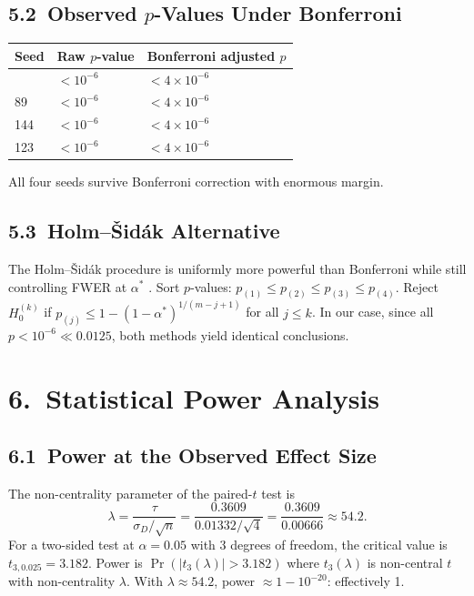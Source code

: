 \subsection{5.2\ Observed \(p\)-Values Under Bonferroni}

\begin{longtable}[]{@{}lll@{}}
\toprule\noalign{}
Seed & Raw \(p\)-value & Bonferroni adjusted \(p\) \\
\midrule\noalign{}
\endhead
\bottomrule\noalign{}
\endlastfoot
47  & \(< 10^{-6}\) & \(< 4 \times 10^{-6}\) \\
89  & \(< 10^{-6}\) & \(< 4 \times 10^{-6}\) \\
144 & \(< 10^{-6}\) & \(< 4 \times 10^{-6}\) \\
123 & \(< 10^{-6}\) & \(< 4 \times 10^{-6}\) \\
\end{longtable}

\noindent
All four seeds survive Bonferroni correction with enormous margin.

\subsection{5.3\ Holm--Šidák Alternative}

The Holm--Šidák procedure is uniformly more powerful than Bonferroni while
still controlling FWER at \(\alpha^*\) \cite{wasserman2004statistics}.
Sort \(p\)-values: \(p_{(1)} \leq p_{(2)} \leq p_{(3)} \leq p_{(4)}\).
Reject \(H_0^{(k)}\) if
\(p_{(j)} \leq 1 - (1 - \alpha^*)^{1/(m - j + 1)}\) for all \(j \leq k\).
In our case, since all \(p < 10^{-6} \ll 0.0125\), both methods yield
identical conclusions.

\section{6.\ Statistical Power Analysis}\label{sec:ch26-power}

\subsection{6.1\ Power at the Observed Effect Size}

The non-centrality parameter of the paired-\(t\) test is
\[
  \lambda = \frac{\tau}{\sigma_D/\sqrt{n}} = \frac{0.3609}{0.01332/\sqrt{4}}
    = \frac{0.3609}{0.00666} \approx 54.2.
\]
For a two-sided test at \(\alpha = 0.05\) with 3 degrees of freedom,
the critical value is \(t_{3, 0.025} = 3.182\).
Power is \(\Pr(|t_3(\lambda)| > 3.182)\) where \(t_3(\lambda)\) is
non-central \(t\) with non-centrality \(\lambda\).
With \(\lambda \approx 54.2\), power \(\approx 1 - 10^{-20}\): effectively 1.

